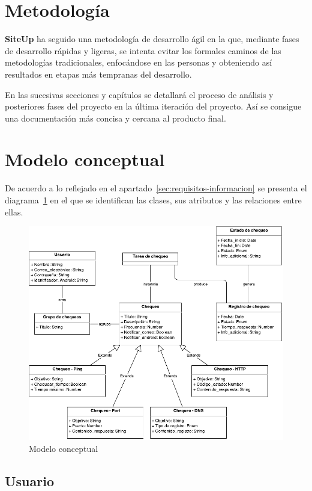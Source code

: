 
\section{Metodología}
\textbf{SiteUp} ha seguido una metodología de desarrollo ágil en la que,
mediante fases de desarrollo rápidas y ligeras, se intenta evitar los formales
caminos de las metodologías tradicionales, enfocándose en las personas y
obteniendo así resultados en etapas más tempranas del desarrollo.

En las sucesivas secciones y capítulos se detallará el proceso de análisis y
posteriores fases del proyecto en la última iteración del proyecto. Así se
consigue una documentación más concisa y cercana al producto final.

\section{Modelo conceptual}

De acuerdo a lo reflejado en el apartado~\ref{sec:requisitos-informacion} se
presenta el diagrama~\ref{fig:modelo-conceptual} en el que se identifican las
clases, sus atributos y las relaciones entre ellas.

\begin{figure}[hp]
  \centering
  \includegraphics[width=\textwidth]{4_analisis/diagrama_clases_conceptuales}
  \caption{Modelo conceptual}
  \label{fig:modelo-conceptual}
\end{figure}


\subsection{Usuario}

